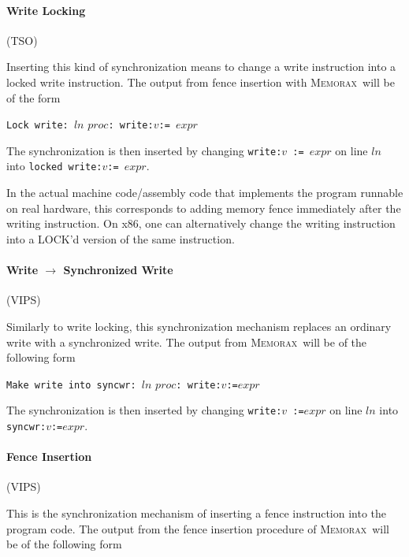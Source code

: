 \documentclass[a4paper]{article}
\newcommand{\memorax}{\textsc{Memorax}}
\begin{document}
\paragraph{Write Locking}\hfill(TSO)

Inserting this kind of synchronization means to change a write
instruction into a locked write instruction. The output from fence
insertion with \memorax\ will be of the form

\vspace{10pt}

\noindent
{\tt Lock write: }$ln$ $proc${\tt : write:}$v${\tt := }$expr$

\vspace{10pt}

The synchronization is then inserted by changing {\tt write:}$v${\tt
  := }$expr$ on line $ln$ into {\tt locked write:}$v${\tt := }$expr$.

In the actual machine code/assembly code that implements the program
runnable on real hardware, this corresponds to adding memory fence
immediately after the writing instruction. On x86, one can
alternatively change the writing instruction into a LOCK'd version of
the same instruction.

\paragraph{Write $\rightarrow$ Synchronized Write}\hfill(VIPS)

Similarly to write locking, this synchronization mechanism replaces an
ordinary write with a synchronized write. The output from
\memorax\ will be of the following form

\vspace{10pt}

\noindent
{\tt Make write into syncwr: }$ln$ $proc${\tt : write:}$v${\tt :=}$expr$

\vspace{10pt}

The synchronization is then inserted by changing {\tt write:}$v${\tt
  :=}$expr$ on line $ln$ into {\tt syncwr:}$v${\tt :=}$expr$.

\paragraph{Fence Insertion}\hfill(VIPS)

This is the synchronization mechanism of inserting a fence instruction
into the program code. The output from the fence insertion procedure
of \memorax\ will be of the following form
\end{document}

